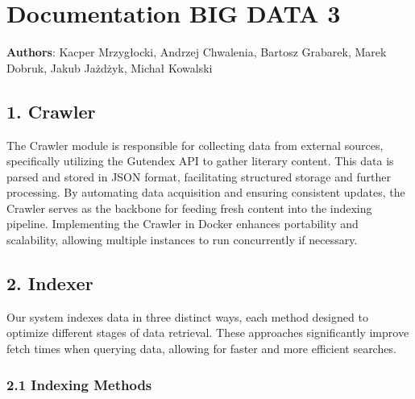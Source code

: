 \hypertarget{documentation-big-data-3}{%
\section{Documentation BIG DATA 3}\label{documentation-big-data-3}}

\textbf{Authors}: Kacper Mrzygłocki, Andrzej Chwalenia, Bartosz
Grabarek, Marek Dobruk, Jakub Jażdżyk, Michał Kowalski

\hypertarget{crawler}{%
\subsection{1. Crawler}\label{crawler}}

The Crawler module is responsible for collecting data from external
sources, specifically utilizing the Gutendex API to gather literary
content. This data is parsed and stored in JSON format, facilitating
structured storage and further processing. By automating data
acquisition and ensuring consistent updates, the Crawler serves as the
backbone for feeding fresh content into the indexing pipeline.
Implementing the Crawler in Docker enhances portability and scalability,
allowing multiple instances to run concurrently if necessary.

\hypertarget{indexer}{%
\subsection{2. Indexer}\label{indexer}}

Our system indexes data in three distinct ways, each method designed to
optimize different stages of data retrieval. These approaches
significantly improve fetch times when querying data, allowing for
faster and more efficient searches.

\hypertarget{indexing-methods}{%
\subsubsection{2.1 Indexing Methods}\label{indexing-methods}}

